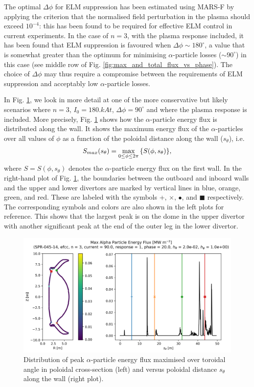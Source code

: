 \documentclass[10pt, a4paper, twoside]{article}
\begin{document}
The optimal $\Delta\phi$ for ELM suppression has been estimated using MARS-F by applying the criterion that the normalised field perturbation in the plasma should exceed $10^{-4}$: this has been found to be required for effective ELM control in current experiments. In the case of $n = 3$, with the plasma response included, it has been found that ELM suppression is favoured when $\Delta\phi \sim 180^{\circ}$, a value that is somewhat greater than the optimum for minimising $\alpha$-particle losses ($\sim 90^{\circ}$) in this case (see middle row of Fig. \ref{fig:max_and_total_flux_vs_phase}). The choice of $\Delta\phi$ may thus require a compromise between the requirements of ELM suppression and acceptably low $\alpha$-particle losses.  

In Fig. \ref{fig:energy_flux_distribution}, we look in more detail at one of the more conservative but likely scenarios where $n=3$, $I_0= 180\si{.kAt}$, $\Delta \phi = 90^\circ$ and where the plasma response is included. More precisely, Fig. \ref{fig:energy_flux_distribution} shows how the $\alpha$-particle energy flux is distributed along the wall. It shows the maximum energy flux of the $\alpha$-particles over all values of $\phi$ as a function of the poloidal distance along the wall ($s_\theta$), i.e.
\begin{equation}
    S_{max}(s_\theta) = \max_{0\le \phi \le 2\pi}\qty{S(\phi, s_\theta)},
\end{equation}
where $S=S(\phi, s_\theta)$ denotes the $\alpha$-particle energy flux on the first wall.
In the right-hand plot of Fig. \ref{fig:energy_flux_distribution}, the boundaries between the outboard and inboard walls and the upper and lower divertors are marked by vertical lines in blue, orange, green, and red. These are labeled with the symbols +, $\times$, $\bullet$, and $\blacksquare$ respectively. The corresponding symbols and colors are also shown in the left plots for reference. This shows that the largest peak is on the dome in the upper divertor with another significant peak at the end of the outer leg in the lower divertor.

\begin{figure}[!htb]
    \centering
    \includegraphics[width=0.7\linewidth]{Figures/simple_line_plot_no_confidence_band.png}
    \caption{Distribution of peak $\alpha$-particle energy flux maximised over toroidal angle in poloidal cross-section (left) and versus poloidal distance $s_\theta$ along the wall (right plot).}
    \label{fig:energy_flux_distribution}
\end{figure}
\end{document}
